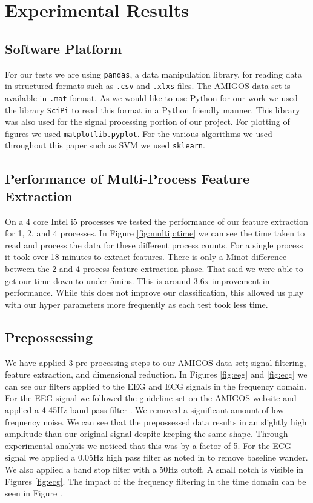 \section{Experimental Results}
\label{sec:experimental_results}
\subsection{Software Platform}
For our tests we are using \texttt{pandas},
a data manipulation library,
for reading data in structured formats such as
\texttt{.csv} and \texttt{.xlxs} files.
The AMIGOS data set is available in \texttt{.mat} format.
As we would like to use Python for our work we used
the library \texttt{SciPi} to read this format in a Python friendly manner.
This library was also used for the signal processing portion of our project.
For plotting of figures we used \texttt{matplotlib.pyplot}.
For the various algorithms we used throughout this paper such as SVM we
used \texttt{sklearn}.


\subsection{Performance of Multi-Process Feature Extraction}
On a 4 core Intel i5 processes we tested the performance of our feature extraction
for 1, 2, and 4 processes.
In Figure \ref{fig:multip:time} we can see the time taken to read and process
the data for these different process counts.
For a single process it took over 18 minutes to extract features.
There is only a Minot difference between the 2 and 4 process feature extraction phase.
That said we were able to get our time down to under 5mins.
This is around 3.6x improvement in performance.
While this does not improve our classification, this allowed us play
with our hyper parameters more frequently as each test took less time.


\subsection{Prepossessing}
We have applied 3 pre-processing steps to our AMIGOS data set;
signal filtering, feature extraction, and dimensional reduction.
In Figures \ref{fig:eeg} and \ref{fig:ecg}
we can see our filters applied to the EEG and ECG signals in the frequency domain.
For the EEG signal we followed the guideline set on the AMIGOS
website and applied a 4-45Hz band pass filter \cite{AMIGOS:2018}.
We removed a significant amount of low frequency noise.
We can see that the prepossessed data results
in an slightly high amplitude than our original signal despite keeping the same shape.
Through experimental analysis we noticed that this was by a factor of 5.
For the ECG signal we applied a 0.05Hz high pass filter as noted in
\cite{SantamariaGranados:2019}
to remove baseline wander.
We also applied a band stop filter with a 50Hz cutoff.
A small notch is visible in
Figures \ref{fig:ecg}.
The impact of the frequency filtering in the time domain can be seen in Figure
\label{fig:ecg:time}.

